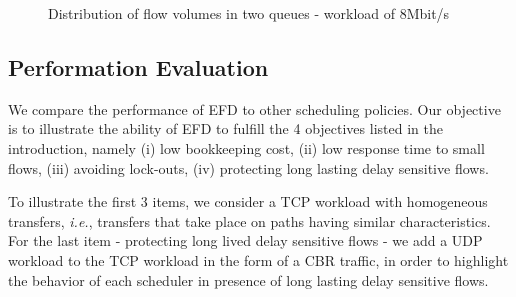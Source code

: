 \documentclass[preprint,12pt]{elsarticle}
\begin{document}
\begin{figure}[ht]
  \centering
  \caption{Distribution of flow volumes in two queues - workload of 8Mbit/s}
  \label{fig:flow_dist}
\end{figure}

\subsection{Performation Evaluation}
We compare the performance of EFD to other scheduling policies. Our objective is to illustrate the ability of EFD to fulfill the 4 objectives listed in the introduction, namely (i) low bookkeeping cost, (ii) low response time to small flows, (iii) avoiding lock-outs, (iv) protecting long lasting delay sensitive flows.%

To illustrate the first 3 items, we consider a TCP workload with homogeneous transfers, \textit{i.e.}, transfers that take place on paths having similar characteristics. For the last item - protecting long lived delay sensitive flows - we add a UDP workload to the TCP workload in the form of a CBR traffic,  in order to highlight the behavior of each scheduler in presence of long lasting delay sensitive flows. %
\end{document}
